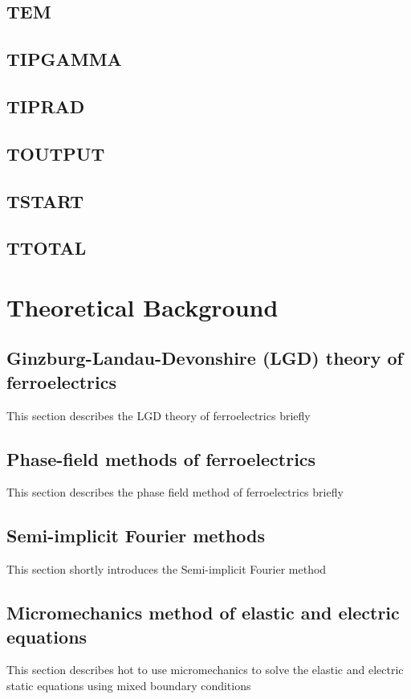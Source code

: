 \documentclass{article}
\begin{document}
\subsection{TEM      }

\subsection{TIPGAMMA }

\subsection{TIPRAD   }

\subsection{TOUTPUT  }

\subsection{TSTART   }

\subsection{TTOTAL   }

\clearpage{}
\section{Theoretical Background}

\subsection{Ginzburg-Landau-Devonshire (LGD) theory of ferroelectrics}
This section describes the LGD theory of ferroelectrics briefly

\subsection{Phase-field methods of ferroelectrics}
This section describes the phase field method of ferroelectrics briefly 

\subsection{Semi-implicit Fourier methods}
This section shortly introduces the Semi-implicit Fourier method 

\subsection{Micromechanics method of elastic and electric equations}
This section describes hot to use micromechanics to solve the elastic and electric static equations using mixed boundary conditions
\end{document}
